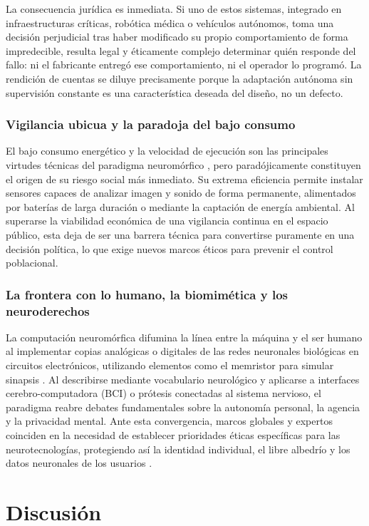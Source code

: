 \documentclass[a4paper,11pt,oneside]{book}
\begin{document}
La consecuencia jurídica es inmediata. Si uno de estos sistemas, integrado en
infraestructuras críticas, robótica médica o vehículos autónomos, toma una
decisión perjudicial tras haber modificado su propio comportamiento de forma
impredecible, resulta legal y éticamente complejo determinar quién responde del
fallo: ni el fabricante entregó ese comportamiento, ni el operador lo programó.
La rendición de cuentas se diluye precisamente porque la adaptación autónoma sin
supervisión constante es una característica deseada del diseño, no un defecto.

\subsection{Vigilancia ubicua y la paradoja del bajo consumo}
El bajo consumo energético y la velocidad de ejecución son las principales virtudes técnicas del paradigma neuromórfico \parencite{schuman2022}, pero paradójicamente constituyen el origen de su riesgo social más inmediato. Su extrema eficiencia permite instalar sensores capaces de analizar imagen y sonido de forma permanente, alimentados por baterías de larga duración o mediante la captación de energía ambiental. Al superarse la viabilidad económica de una vigilancia continua en el espacio público, esta deja de ser una barrera técnica para convertirse puramente en una decisión política, lo que exige nuevos marcos éticos para prevenir el control poblacional.

\subsection{La frontera con lo humano, la biomimética y los neuroderechos}
La computación neuromórfica difumina la línea entre la máquina y el ser humano al implementar copias analógicas o digitales de las redes neuronales biológicas en circuitos electrónicos, utilizando elementos como el memristor para simular sinapsis \parencite{indiveri2015}. Al describirse mediante vocabulario neurológico y aplicarse a interfaces cerebro-computadora (BCI) o prótesis conectadas al sistema nervioso, el paradigma reabre debates fundamentales sobre la autonomía personal, la agencia y la privacidad mental. Ante esta convergencia, marcos globales y expertos coinciden en la necesidad de establecer prioridades éticas específicas para las neurotecnologías, protegiendo así la identidad individual, el libre albedrío y los datos neuronales de los usuarios \parencite{yuste2017}.

\chapter{Discusión}
\label{cap:discusion}
\end{document}
